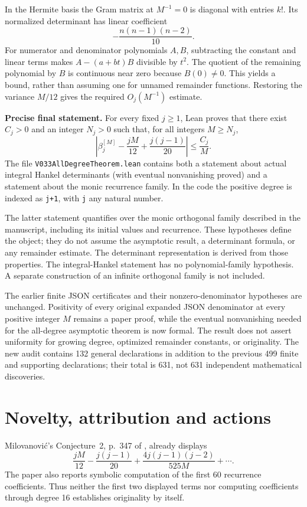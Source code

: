 \documentclass[11pt,a4paper]{article}
\begin{document}
In the Hermite basis the Gram matrix at $M^{-1}=0$ is diagonal with entries $k!$. Its normalized determinant has linear coefficient
\[
-\frac{n(n-1)(n-2)}{10}.
\]
For numerator and denominator polynomials $A,B$, subtracting the constant and linear terms makes $A-(a+bt)B$ divisible by $t^2$. The quotient of the remaining polynomial by $B$ is continuous near zero because $B(0)\ne0$. This yields a bound, rather than assuming one for unnamed remainder functions. Restoring the variance $M/12$ gives the required $O_j(M^{-1})$ estimate.

\textbf{Precise final statement.} For every fixed $j\geq1$, Lean proves that there exist $C_j>0$ and an integer $N_j>0$ such that, for all integers $M\geq N_j$,
\[
\left|\beta_j^{[M]}-\frac{jM}{12}+\frac{j(j-1)}{20}\right|
\leq\frac{C_j}{M}.
\]
The file \texttt{V033AllDegreeTheorem.lean} contains both a statement about actual integral Hankel determinants (with eventual nonvanishing proved) and a statement about the monic recurrence family. In the code the positive degree is indexed as \texttt{j+1}, with \texttt{j} any natural number.

The latter statement quantifies over the monic orthogonal family described in the manuscript, including its initial values and recurrence. These hypotheses define the object; they do not assume the asymptotic result, a determinant formula, or any remainder estimate. The determinant representation is derived from those properties. The integral-Hankel statement has no polynomial-family hypothesis. A separate construction of an infinite orthogonal family is not included.

The earlier finite JSON certificates and their nonzero-denominator hypotheses are unchanged. Positivity of every original expanded JSON denominator at every positive integer $M$ remains a paper proof, while the eventual nonvanishing needed for the all-degree asymptotic theorem is now formal. The result does not assert uniformity for growing degree, optimized remainder constants, or originality. The new audit contains 132 general declarations in addition to the previous 499 finite and supporting declarations; their total is 631, not 631 independent mathematical discoveries.

\section{Novelty, attribution and actions}
Milovanovi\'c's Conjecture~2, p.~347 of \cite{milovanovic}, already displays
\[
\frac{jM}{12}-\frac{j(j-1)}{20}
+\frac{4j(j-1)(j-2)}{525M}+\cdots .
\]
The paper also reports symbolic computation of the first 60 recurrence coefficients. Thus neither the first two displayed terms nor computing coefficients through degree 16 establishes originality by itself.
\end{document}
